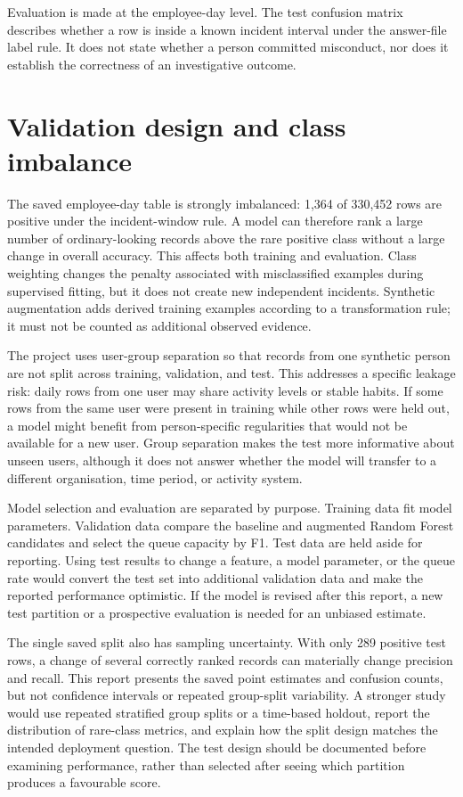 Evaluation is made at the employee-day level. The test confusion
matrix describes whether a row is inside a known incident interval
under the answer-file label rule. It does not state whether a person
committed misconduct, nor does it establish the correctness of an
investigative outcome.

\section{Validation design and class imbalance}
The saved employee-day table is strongly imbalanced: 1,364 of 330,452
rows are positive under the incident-window rule. A model can therefore
rank a large number of ordinary-looking records above the rare positive
class without a large change in overall accuracy. This affects both
training and evaluation. Class weighting changes the penalty associated
with misclassified examples during supervised fitting, but it does not
create new independent incidents. Synthetic augmentation adds derived
training examples according to a transformation rule; it must not be
counted as additional observed evidence.

The project uses user-group separation so that records from one
synthetic person are not split across training, validation, and test.
This addresses a specific leakage risk: daily rows from one user may
share activity levels or stable habits. If some rows from the same user
were present in training while other rows were held out, a model might
benefit from person-specific regularities that would not be available
for a new user. Group separation makes the test more informative about
unseen users, although it does not answer whether the model will
transfer to a different organisation, time period, or activity system.

Model selection and evaluation are separated by purpose. Training data
fit model parameters. Validation data compare the baseline and
augmented Random Forest candidates and select the queue capacity by
F1. Test data are held aside for reporting. Using test results to
change a feature, a model parameter, or the queue rate would convert
the test set into additional validation data and make the reported
performance optimistic. If the model is revised after this report, a
new test partition or a prospective evaluation is needed for an
unbiased estimate.

The single saved split also has sampling uncertainty. With only 289
positive test rows, a change of several correctly ranked records can
materially change precision and recall. This report presents the saved
point estimates and confusion counts, but not confidence intervals or
repeated group-split variability. A stronger study would use repeated
stratified group splits or a time-based holdout, report the distribution
of rare-class metrics, and explain how the split design matches the
intended deployment question. The test design should be documented
before examining performance, rather than selected after seeing which
partition produces a favourable score.

